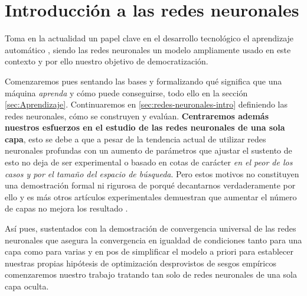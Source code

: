 
\chapter{Introducción a las redes neuronales} 

Toma en la actualidad un papel clave en el desarrollo tecnológico el aprendizaje automático
\cite{importancia-arte-aprendizaje-automatico}, siendo 
las redes neuronales un modelo ampliamente usado en este contexto y por ello 
nuestro objetivo de democratización. 

Comenzaremos pues  sentando las bases y 
formalizando  
qué significa 
que una máquina \textit{aprenda}  y cómo puede conseguirse, 
todo ello en la sección \ref{sec:Aprendizaje}.
Continuaremos en \ref{sec:redes-neuronales-intro} 
definiendo las redes neuronales, cómo se construyen y evalúan. 
\label{motivo-una-capa}
\textbf{Centraremos además nuestros esfuerzos en el estudio de las redes neuronales de una sola capa}, 
esto se debe a que a pesar de la tendencia actual de utilizar redes neuronales profundas con 
un aumento de parámetros que ajustar 
\cite{a-universal-law-of-Robustness} \cite{CHAI2021100134} el sustento de esto no deja de ser experimental 
o basado en cotas de carácter \textit{en el peor de los casos y por el tamaño del espacio de búsqueda}.
Pero estos motivos no constituyen una demostración formal ni rigurosa de porqué decantarnos verdaderamente por 
ello y es más otros artículos experimentales demuestran que aumentar el número de capas no mejora los resultado 
\cite{DBLP:conf/iwann/Linan-Villafranca21}. 

Así pues, sustentados con la demostración de convergencia universal \cite{HORNIK1989359}
de las redes neuronales que asegura la convergencia en igualdad de condiciones 
tanto para una capa como para varias
y en pos de simplificar el modelo a priori 
para establecer nuestras propias hipótesis de optimización desprovistos
de sesgos empíricos comenzaremos nuestro trabajo tratando tan solo de redes neuronales de una sola capa oculta.
